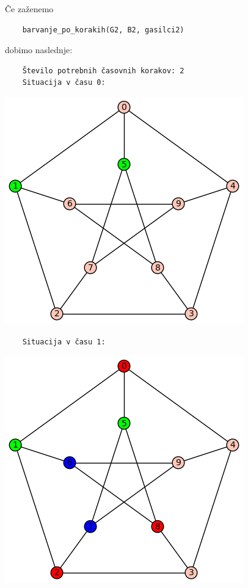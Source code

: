 \documentclass[a4paper, 12pt]{article}
\begin{document}
\noindent Če zaženemo
\begin{small}
\begin{verbatim}
    barvanje_po_korakih(G2, B2, gasilci2)
\end{verbatim}
\end{small}
dobimo naslednje:
\begin{small}
\begin{verbatim}
    Število potrebnih časovnih korakov: 2
    Situacija v času 0:
\end{verbatim}
\end{small}
    \begin{center}
        \includegraphics[scale=0.5]{peterson0}
    \end{center}
\begin{small}
\begin{verbatim}
    Situacija v času 1:
\end{verbatim}
\end{small}
    \begin{center}
        \includegraphics[scale=0.5]{peterson1}
    \end{center}
\end{document}
